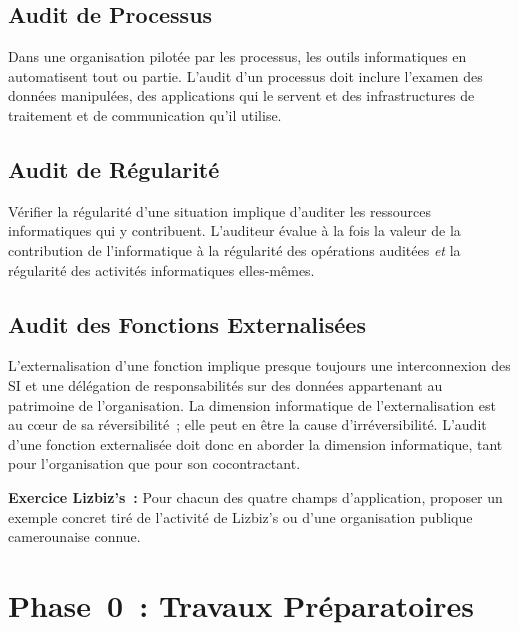 \subsection{Audit de Processus}

Dans une organisation pilotée par les processus, les outils informatiques en
automatisent tout ou partie. L'audit d'un processus doit inclure l'examen des données
manipulées, des applications qui le servent et des infrastructures de traitement et de
communication qu'il utilise.

\subsection{Audit de Régularité}

Vérifier la régularité d'une situation implique d'auditer les ressources informatiques
qui y contribuent. L'auditeur évalue à la fois la valeur de la contribution de
l'informatique à la régularité des opérations auditées \emph{et} la régularité des
activités informatiques elles-mêmes.

\subsection{Audit des Fonctions Externalisées}

L'externalisation d'une fonction implique presque toujours une interconnexion des SI
et une délégation de responsabilités sur des données appartenant au patrimoine de
l'organisation. La dimension informatique de l'externalisation est au cœur de sa
réversibilité~; elle peut en être la cause d'irréversibilité. L'audit d'une fonction
externalisée doit donc en aborder la dimension informatique, tant pour l'organisation
que pour son cocontractant.

\begin{boxlizbiz}
\textbf{Exercice Lizbiz's~:}
Pour chacun des quatre champs d'application, proposer un exemple concret tiré
de l'activité de Lizbiz's ou d'une organisation publique camerounaise connue.
\end{boxlizbiz}

\section{Phase~0~: Travaux Préparatoires}
\label{sec:travaux-prep}

